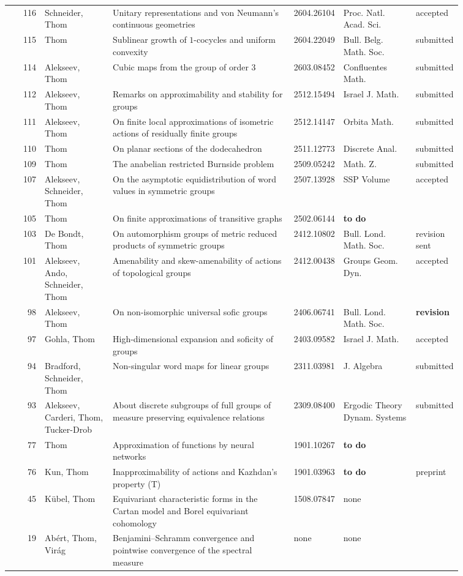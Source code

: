 \documentclass[11pt, landscape]{article}
\begin{document}
\begin{center}
\begin{longtable}{r|p{0.15\linewidth}|p{0.40\linewidth}|p{0.08\linewidth}|p{0.16\linewidth}|p{0.07\linewidth}}
116 & Schneider, Thom & Unitary representations and von Neumann's continuous geometries & 2604.26104 & Proc. Natl. Acad. Sci. & accepted\\
115 & Thom & Sublinear growth of $1$-cocycles and uniform convexity & 2604.22049 & Bull. Belg. Math. Soc. & submitted\\
114 & Alekseev, Thom & Cubic maps from the group of order $3$ & 2603.08452 & Confluentes Math. & submitted\\
112 & Alekseev, Thom & Remarks on approximability and stability for groups & 2512.15494 & Israel J. Math. & submitted\\
111 & Alekseev, Thom & On finite local approximations of isometric actions of residually finite groups & 2512.14147 & Orbita Math. & submitted\\
110 & Thom & On planar sections of the dodecahedron & 2511.12773 & Discrete Anal. & submitted\\
109 & Thom & The anabelian restricted Burnside problem & 2509.05242 & Math. Z. & submitted\\
107 & Alekseev, Schneider, Thom & On the asymptotic equidistribution of word values in symmetric groups & 2507.13928 & SSP Volume & accepted\\
105 & Thom & On finite approximations of transitive graphs & 2502.06144 & {\bf to do} & \\
103 & De Bondt, Thom & On automorphism groups of metric reduced products of symmetric groups & 2412.10802 & Bull. Lond. Math. Soc. & revision sent\\
101 & Alekseev, Ando, Schneider, Thom & Amenability and skew-amenability of actions of topological groups & 2412.00438 & Groups Geom. Dyn. & accepted \\
98 & Alekseev, Thom & On non-isomorphic universal sofic groups & 2406.06741 & Bull. Lond. Math. Soc. & {\bf revision} \\
97 & Gohla, Thom & High-dimensional expansion and soficity of groups & 2403.09582 & Israel J. Math. & accepted\\
94 & Bradford, Schneider, Thom & Non-singular word maps for linear groups & 2311.03981 & J. Algebra & submitted\\
93 & Alekseev, Carderi, Thom, Tucker-Drob & About discrete subgroups of full groups of measure preserving equivalence relations & 2309.08400 & Ergodic Theory Dynam. Systems & submitted\\
77 & Thom & Approximation of functions by neural networks & 1901.10267 & {\bf to do} & \\
76 & Kun, Thom & Inapproximability of actions and Kazhdan's property (T) & 1901.03963 & {\bf to do}& preprint \\
45 & K\"ubel, Thom & Equivariant characteristic forms in the Cartan model and Borel equivariant cohomology & 1508.07847 & none & \\
19 & Ab\'ert, Thom, Vir\'ag & Benjamini--Schramm convergence and pointwise convergence of the spectral measure & none & none &  \\
\end{longtable}
\end{center}
\end{document}
